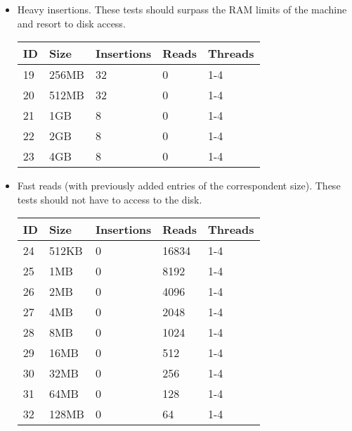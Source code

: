 \documentclass[11pt]{article}
\begin{document}
\begin{itemize}
\item Heavy insertions. These tests should surpass the RAM limits of the machine and resort to disk access.
\begin{center}
    \begin{tabular}{| p{0.45cm} | p{2.5cm} | p{1.75cm} | p{1.25cm} | p{1.5cm} |}
    \hline
    ID & Size & Insertions & Reads & Threads
    \\ \hline
    19 & 256MB & 32 & 0 & 1-4
    \\ \hline
    20 & 512MB & 32 & 0 & 1-4
    \\ \hline
    21 & 1GB & 8 & 0 & 1-4
    \\ \hline
    22 & 2GB & 8 & 0 & 1-4
    \\ \hline
    23 & 4GB & 8 & 0 & 1-4
    \\ \hline
    \end{tabular}
\end{center}

\item Fast reads (with previously added entries of the correspondent size). These tests should not have to access to the disk.
\begin{center}
    \begin{tabular}{| p{0.45cm} | p{2.5cm} | p{1.75cm} | p{1.25cm} | p{1.5cm} |}
    \hline
    ID & Size & Insertions & Reads & Threads
    \\ \hline
    24 & 512KB & 0 & 16834 & 1-4
    \\ \hline
    25 & 1MB & 0 & 8192 & 1-4
    \\ \hline
    26 & 2MB & 0 & 4096 & 1-4
    \\ \hline
    27 & 4MB & 0 & 2048 & 1-4
    \\ \hline
    28 & 8MB & 0 & 1024 & 1-4
    \\ \hline
    29 & 16MB & 0 & 512 & 1-4
    \\ \hline
    30 & 32MB & 0 & 256 & 1-4
    \\ \hline
    31 & 64MB & 0 & 128 & 1-4
    \\ \hline
    32 & 128MB & 0 & 64 & 1-4
    \\ \hline
    \end{tabular}
\end{center}


\end{itemize}
\end{document}
